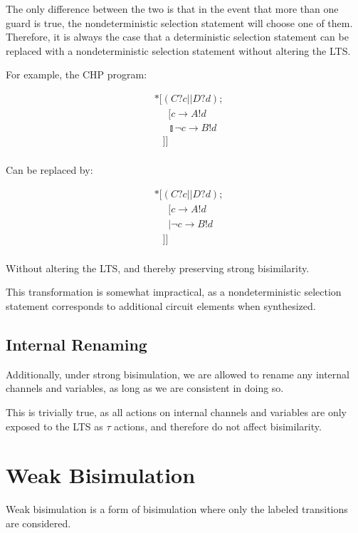 \documentclass[times, 10pt]{article}
\begin{document}
The only difference between the two is that in the event that more than one
guard is true, the nondeterministic selection statement will choose one of them.
Therefore, it is always the case that a deterministic selection statement can be
replaced with a nondeterministic selection statement without altering the LTS.

For example, the CHP program:

\begin{align*}
&*[(C?c || D?d); \\
& \;\;\;\;\;[ c \rightarrow A!d \\
& \;\;\;\;\;\talloblong \lnot c \rightarrow B!d \\
& \;\;\;]] \\
\end{align*}

Can be replaced by:

\begin{align*}
&*[(C?c || D?d); \\
& \;\;\;\;\;[ c \rightarrow A!d \\
& \;\;\;\;\;| \lnot c \rightarrow B!d \\
& \;\;\;]] \\
\end{align*}

Without altering the LTS, and thereby preserving strong bisimilarity.

This transformation is somewhat impractical, as a nondeterministic selection
statement corresponds to additional circuit elements when synthesized.

\subsection{Internal Renaming}

Additionally, under strong bisimulation, we are allowed to rename any internal
channels and variables, as long as we are consistent in doing so.

This is trivially true, as all actions on internal channels and variables are
only exposed to the LTS as $\tau$ actions, and therefore do not affect
bisimilarity. 

\section{Weak Bisimulation}

Weak bisimulation is a form of bisimulation where only the labeled transitions
are considered.
\end{document}
